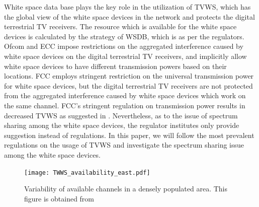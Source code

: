 \documentclass[times]{ettauth}
\theoremstyle{mytheoremstyle}
\theoremstyle{mytheoremstyle}
\theoremstyle{mytheoremstyle}
\begin{document}
White space data base plays the key role in the utilization of TVWS, which has the global view of the white space devices in the network and protects the digital terrestrial TV receivers.
The resource which is available for the white space devices is calculated by the strategy of WSDB, which is as per the regulators.
Ofcom and ECC impose restrictions on the aggregated interference caused by white space devices on the digital terrestrial TV receivers, and implicitly allow white space devices to have different transmission powers based on their locations.
FCC employs stringent restriction on the universal transmission power for white space devices, but the digital terrestrial TV receivers are not protected from the aggregated interference caused by white space devices which work on the same channel. 
FCC's stringent regulation on transmission power results in decreased TVWS as suggested in \cite{Harrison2012Dyspan}.
%
Nevertheless, as to the issue of spectrum sharing among the white space devices, the regulator institutes only provide suggestion instead of regulations.
In this paper, we will follow the most prevalent regulations on the usage of TVWS and investigate the spectrum sharing issue among the white space devices.







\begin{figure}[h!]
  \centering
  \texttt{[image: TWWS\_availability\_east.pdf]}
  \caption{Variability of available channels in a densely populated area. This figure is obtained from \cite{googleDatabase}}
\label{variability_TVWS}
\end{figure}
\end{document}
